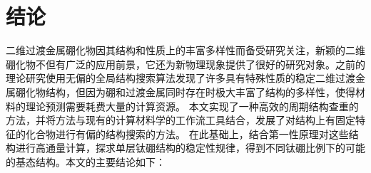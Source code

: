 \documentclass[phd,nobackinfo]{scutthesis}
\begin{document}
\listoffigures

\listoftables

\mainmatter


%

%

%




\chapter{结论}\label{chapter_concludes}

二维过渡金属硼化物因其结构和性质上的丰富多样性而备受研究关注，新颖的二维硼化物不但有广泛的应用前景，它还为新物理现象提供了很好的研究对象。之前的理论研究使用无偏的全局结构搜索算法发现了许多具有特殊性质的稳定二维过渡金属硼化物结构，但因为硼和过渡金属同时存在时极大丰富了结构的多样性，使得材料的理论预测需要耗费大量的计算资源。
本文实现了一种高效的周期结构查重的方法，并将方法与现有的计算材料学的工作流工具结合，发展了对结构上有固定特征的化合物进行有偏的结构搜索的方法。
在此基础上，结合第一性原理对这些结构进行高通量计算，探求单层钛硼结构的稳定性规律，得到不同钛硼比例下的可能的基态结构。本文的主要结论如下：
\end{document}
